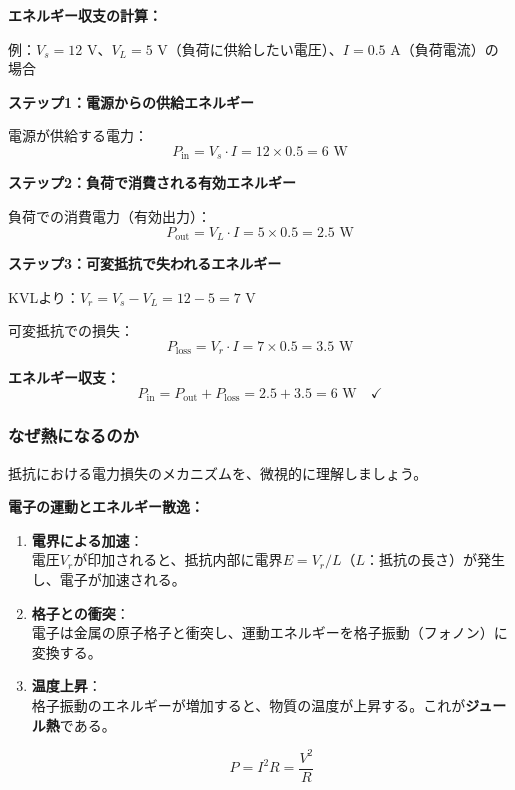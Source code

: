 \textbf{エネルギー収支の計算：}

\begin{screen}
例：$V_s = 12$ V、$V_L = 5$ V（負荷に供給したい電圧）、$I = 0.5$ A（負荷電流）の場合

\textbf{ステップ1：電源からの供給エネルギー}

電源が供給する電力：
\begin{equation}
P_{\text{in}} = V_s \cdot I = 12 \times 0.5 = 6 \text{ W}
\end{equation}

\textbf{ステップ2：負荷で消費される有効エネルギー}

負荷での消費電力（有効出力）：
\begin{equation}
P_{\text{out}} = V_L \cdot I = 5 \times 0.5 = 2.5 \text{ W}
\end{equation}

\textbf{ステップ3：可変抵抗で失われるエネルギー}

KVLより：$V_r = V_s - V_L = 12 - 5 = 7$ V

可変抵抗での損失：
\begin{equation}
P_{\text{loss}} = V_r \cdot I = 7 \times 0.5 = 3.5 \text{ W}
\end{equation}

\textbf{エネルギー収支：}
\begin{equation}
P_{\text{in}} = P_{\text{out}} + P_{\text{loss}} = 2.5 + 3.5 = 6 \text{ W} \quad \checkmark
\end{equation}
\end{screen}

\subsubsection{なぜ熱になるのか}

抵抗における電力損失のメカニズムを、微視的に理解しましょう。

\begin{screen}
\textbf{電子の運動とエネルギー散逸：}

\begin{enumerate}
\item \textbf{電界による加速}：\\
電圧$V_r$が印加されると、抵抗内部に電界$E = V_r/L$（$L$：抵抗の長さ）が発生し、電子が加速される。

\item \textbf{格子との衝突}：\\
電子は金属の原子格子と衝突し、運動エネルギーを格子振動（フォノン）に変換する。

\item \textbf{温度上昇}：\\
格子振動のエネルギーが増加すると、物質の温度が上昇する。これが\textbf{ジュール熱}である。

\begin{equation}
P = I^2 R = \frac{V^2}{R}
\end{equation}
\end{enumerate}
\end{screen}

